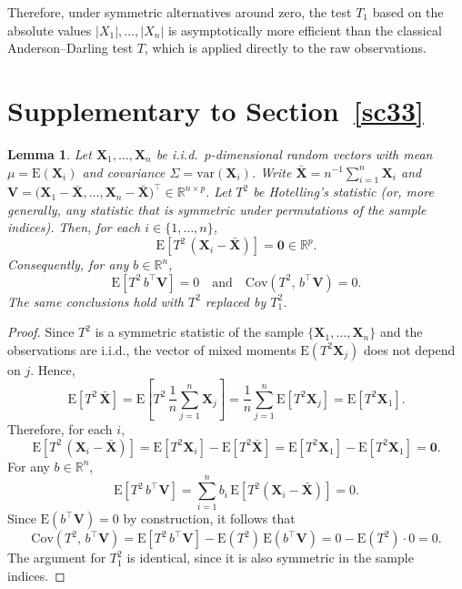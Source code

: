 \documentclass[12pt]{article}
\theoremstyle{remark}
\theoremstyle{plain}
\newtheorem{lemma}[theorem]{Lemma}
\begin{document}
Therefore, under symmetric alternatives around zero, the test \( T_1 \) based on the absolute values \( |X_1|, \ldots, |X_n| \) is asymptotically more efficient than the classical Anderson--Darling test \( T \), which is applied directly to the raw observations.


	\section{Supplementary to Section~\ref{sc33}}\label{S1}
\begin{lemma}\label{SL1}
	Let $\mathbf{X}_{1},\ldots,\mathbf{X}_{n}$ be i.i.d.\ $p$-dimensional random vectors with mean $\mu=\mathrm{E}(\mathbf{X}_{i})$ and covariance $\Sigma=\mathrm{var}(\mathbf{X}_{i})$. 
	Write $\bar{\mathbf{X}}=n^{-1}\sum_{i=1}^{n}\mathbf{X}_{i}$ and 
	$
	\mathbf{V}=\big(\mathbf{X}_{1}-\bar{\mathbf{X}},\ldots,\mathbf{X}_{n}-\bar{\mathbf{X}}\big)^{\!\top}\in\mathbb{R}^{n\times p}.
	$
	Let $T^{2}$ be Hotelling’s statistic (or, more generally, any statistic that is symmetric under permutations of the sample indices). Then, for each $i\in\{1,\ldots,n\}$,
	\[
	\mathrm{E}\!\left[T^{2}\,(\mathbf{X}_{i}-\bar{\mathbf{X}})\right]=\mathbf{0}\in\mathbb{R}^{p}.
	\]
	Consequently, for any $b\in\mathbb{R}^{n}$,
	\[
	\mathrm{E}\!\left[T^{2}\, b^{\top}\mathbf{V}\right]=0
	\quad\text{and}\quad
	\mathrm{Cov}\!\left(T^{2},\, b^{\top}\mathbf{V}\right)=0.
	\]
	The same conclusions hold with $T^{2}$ replaced by $T_{1}^{2}$.
\end{lemma}

\begin{proof}
	Since $T^{2}$ is a symmetric statistic of the sample $\{\mathbf{X}_{1},\ldots,\mathbf{X}_{n}\}$ and the observations are i.i.d., the vector of mixed moments $\mathrm{E}(T^{2}\mathbf{X}_{j})$ does not depend on $j$. Hence,
	\[
	\mathrm{E}\!\left[T^{2}\,\bar{\mathbf{X}}\right]
	=\mathrm{E}\!\left[T^{2}\,\frac{1}{n}\sum_{j=1}^{n}\mathbf{X}_{j}\right]
	=\frac{1}{n}\sum_{j=1}^{n}\mathrm{E}\!\left[T^{2}\mathbf{X}_{j}\right]
	=\mathrm{E}\!\left[T^{2}\mathbf{X}_{1}\right].
	\]
	Therefore, for each $i$,
	\[
	\mathrm{E}\!\left[T^{2}\,(\mathbf{X}_{i}-\bar{\mathbf{X}})\right]
	=\mathrm{E}\!\left[T^{2}\mathbf{X}_{i}\right]-\mathrm{E}\!\left[T^{2}\bar{\mathbf{X}}\right]
	=\mathrm{E}\!\left[T^{2}\mathbf{X}_{1}\right]-\mathrm{E}\!\left[T^{2}\mathbf{X}_{1}\right]
	=\mathbf{0}.
	\]
	For any $b\in\mathbb{R}^{n}$,
	\[
	\mathrm{E}\!\left[T^{2}\, b^{\top}\mathbf{V}\right]
	=\sum_{i=1}^{n} b_{i}\,\mathrm{E}\!\left[T^{2}(\mathbf{X}_{i}-\bar{\mathbf{X}})\right]
	=0.
	\]
	Since $\mathrm{E}(b^{\top}\mathbf{V})=0$ by construction, it follows that
	\[
	\mathrm{Cov}\!\left(T^{2},\, b^{\top}\mathbf{V}\right)
	=\mathrm{E}\!\left[T^{2}\, b^{\top}\mathbf{V}\right]-\mathrm{E}(T^{2})\,\mathrm{E}\!\left(b^{\top}\mathbf{V}\right)
	=0- \mathrm{E}(T^{2})\cdot 0
	=0.
	\]
	The argument for $T_{1}^{2}$ is identical, since it is also symmetric in the sample indices.
\end{proof}
\end{document}

